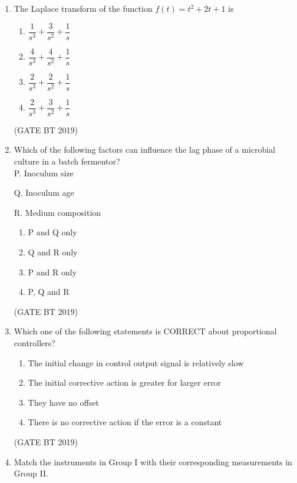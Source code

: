 \documentclass[journal,12pt,onecolumn]{IEEEtran}
\begin{document}
\begin{enumerate}
\item The Laplace transform of the function $f(t) = t^2 + 2t + 1$ is

\begin{multicols}{4}
\begin{enumerate}
\item $\dfrac{1}{s^3} + \dfrac{3}{s^2} + \dfrac{1}{s}$
\item $\dfrac{4}{s^3} + \dfrac{4}{s^2} + \dfrac{1}{s}$
\item $\dfrac{2}{s^3} + \dfrac{2}{s^2} + \dfrac{1}{s}$
\item $\dfrac{2}{s^3} + \dfrac{3}{s^2} + \dfrac{1}{s}$
\end{enumerate}
\end{multicols}\hfill(GATE BT 2019)

\item Which of the following factors can influence the lag phase of a microbial culture in a batch fermentor? \\[6pt]

P. Inoculum size 

Q. Inoculum age 

R. Medium composition

\begin{multicols}{4}
\begin{enumerate}
\item P and Q only
\item Q and R only
\item P and R only
\item P, Q and R
\end{enumerate}
\end{multicols}\hfill(GATE BT 2019)

\item Which one of the following statements is CORRECT about proportional controllers?


\begin{enumerate}
\item The initial change in control output signal is relatively slow
\item The initial corrective action is greater for larger error
\item They have no offset
\item There is no corrective action if the error is a constant
\end{enumerate}
\hfill(GATE BT 2019)

\item Match the instruments in Group I with their corresponding measurements in Group II. \\[6pt]


\end{enumerate}
\end{document}
